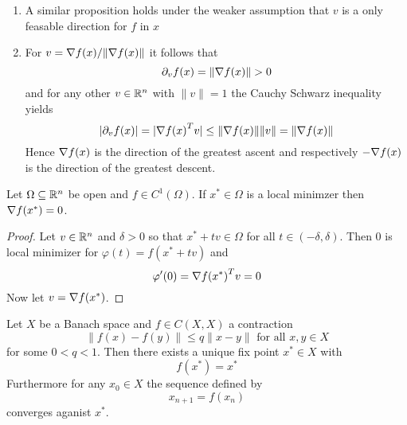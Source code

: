 \begin{remarks}\hfill
    \begin{enumerate}
        \item A similar proposition holds under the weaker assumption that \( v \) is a only feasable direction
              for \( f \) in \( x \)
        \item For \( v = \nabla{f(x)}/\| \nabla{f(x)}\| \) it follows that
              \[
                  \partial_v f (x) = \|\nabla{f(x)}\| > 0
              \]
              and for any other \( v \in \mathbb{R}^n \) with \( \|v\| = 1 \) the Cauchy Schwarz inequality yields
              \[
                  \left|\partial_v f(x)\right| = |\nabla{f(x)}^T v|
                  \le \|\nabla{f(x)}\| \|v\| =\|\nabla{f(x)}\|
              \]
              Hence \( \nabla{f(x)} \) is the direction of the greatest ascent and respectively
              \( -\nabla{f(x)} \) is the direction of the greatest descent.
    \end{enumerate}
\end{remarks}
\bigskip


\begin{theorem}\label{thm:fonc}
    Let \( \Omega \subseteq \mathbb{R}^n \) be open and \( f \in C^1(\Omega) \). If \( x^* \in \Omega \) is a local minimzer then
    \( \nabla f(x^*) = 0 \).
\end{theorem}

\begin{proof}
    Let \( v \in \mathbb{R}^n \) and \( \delta > 0 \) so that \( x^* + tv \in \Omega \) for all \( t \in (-\delta, \delta) \).
    Then \( 0 \) is local minimizer for \( \varphi(t) = f(x^* + tv) \) and
    \[
        \varphi'(0) = {\nabla f(x^*)}^T v = 0
    \]
    Now let \( v = \nabla f(x^*) \).
\end{proof}
\bigskip


\begin{theorem}\label{thm:banach_fix_point}
    Let \( X \) be a Banach space and \( f \in C(X,X) \) a contraction
    \[
        \|f(x) - f(y)\| \le q \|x - y\| \text{ for all } x, y \in X
    \]
    for some \( 0 < q < 1 \). Then there exists a unique fix point \( x^* \in X \) with
    \[
        f(x^*) = x^*
    \]
    Furthermore for any \( x_0 \in X \) the sequence defined by
    \[
        x_{n+1} = f(x_n)
    \]
    converges aganist \( x^* \).
\end{theorem}

